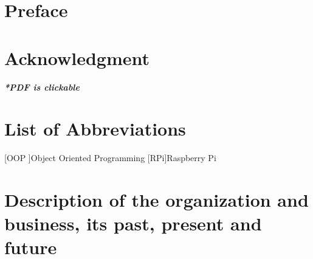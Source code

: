 \documentclass[a4paper,12pt]{report}%
\begin{document}
	



\chapter*{Preface}

 
\cleardoublepage


\chapter*{Acknowledgment}



\tableofcontents %
\vfill
\begin{center}
	\textbf{\textit{*PDF is clickable}}
\end{center}


\chapter*{List of Abbreviations}
\begin{acronym}
	[OOP ]{Object Oriented Programming }
	[RPi]{Raspberry Pi}
\end{acronym}

\listoffigures %
\listoftables %



\pagebreak
\chapter{Description of the organization and business, its past, present and	future}
\end{document}
